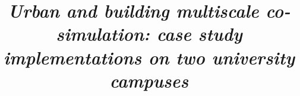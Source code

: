\documentclass{tBPS2e}
\theoremstyle{plain}
\theoremstyle{definition}
\theoremstyle{remark}
\begin{document}


\title{\textit{Urban and building multiscale co-simulation: case study implementations on two university campuses}}


\maketitle
\end{document}
